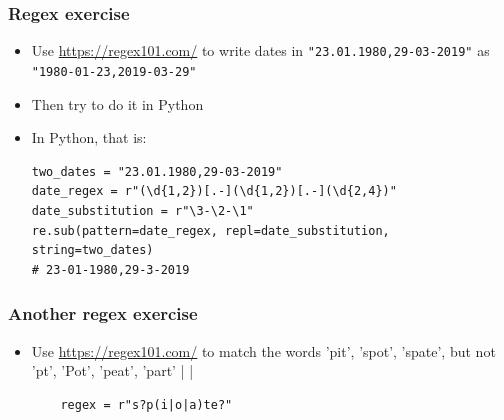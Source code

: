 \documentclass[xcolor=table]{beamer}
\begin{document}

\begin{frame}[fragile]
    \frametitle{Regex exercise}
    \begin{itemize}
        \item Use \url{https://regex101.com/} to write dates in \texttt{"23.01.1980,29-03-2019"} as \texttt{"1980-01-23,2019-03-29"} \pause
        \item Then try to do it in Python \pause 
        \item In Python, that is:
\begin{lstlisting}[style=python,belowskip=-1.5 \baselineskip]
two_dates = "23.01.1980,29-03-2019" 
date_regex = r"(\d{1,2})[.-](\d{1,2})[.-](\d{2,4})"
date_substitution = r"\3-\2-\1"
re.sub(pattern=date_regex, repl=date_substitution, string=two_dates)
# 23-01-1980,29-3-2019 
\end{lstlisting} 
    \end{itemize}
\end{frame}

\begin{frame}[fragile]
    \frametitle{Another regex exercise}
    \begin{itemize}
        \item Use \url{https://regex101.com/} to match the words 'pit', 'spot', 'spate', but not 'pt', 'Pot', 'peat', 'part' | \pause |
\begin{lstlisting} 
    regex = r"s?p(i|o|a)te?"
\end{lstlisting} 
    \end{itemize}
\end{frame}

\end{document}

